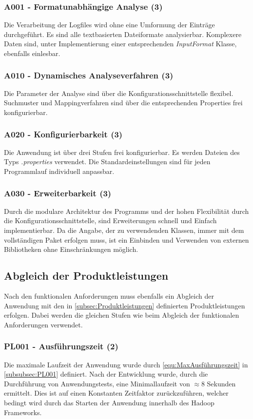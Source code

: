 \subsubsection{A001 - Formatunabhängige Analyse (3)}
Die Verarbeitung der Logfiles wird ohne eine Umformung der Einträge durchgeführt. Es sind alle textbasierten Dateiformate analysierbar. Komplexere Daten sind, unter Implementierung einer entsprechenden \textit{InputFormat} Klasse, ebenfalls einlesbar.

\subsubsection{A010 - Dynamisches Analyseverfahren (3)}
Die Parameter der Analyse sind über die Konfigurationsschnittstelle flexibel. Suchmuster und Mappingverfahren sind über die entsprechenden Properties frei konfigurierbar.

\subsubsection{A020 - Konfigurierbarkeit (3)}
Die Anwendung ist über drei Stufen frei konfigurierbar. Es werden Dateien des Typs \textit{.properties} verwendet. Die Standardeinstellungen sind für jeden Programmlauf individuell anpassbar.

\subsubsection{A030 - Erweiterbarkeit (3)}
Durch die modulare Architektur des Programms und der hohen Flexibilität durch die Konfigurationsschnittstelle, sind Erweiterungen schnell und Einfach implementierbar. Da die Angabe, der zu verwendenden Klassen, immer mit dem vollständigen Paket erfolgen muss, ist ein Einbinden und Verwenden von externen Bibliotheken ohne Einschränkungen möglich.

\subsection{Abgleich der Produktleistungen}
Nach den funktionalen Anforderungen muss ebenfalls ein Abgleich der Anwendung mit den in \autoref{subsec:Produktleistungen} definierten Produktleistungen erfolgen. Dabei werden die gleichen Stufen wie beim Abgleich der funktionalen Anforderungen verwendet.

\subsubsection{PL001 - Ausführungszeit (2)}
Die maximale Laufzeit der Anwendung wurde durch \autoref{equ:MaxAusführungszeit} in \autoref{subsubsec:PL001} definiert. Nach der Entwicklung wurde, durch die Durchführung von Anwendungstests, eine Minimallaufzeit von $\approx 8$ Sekunden ermittelt. Dies ist auf einen Konstanten Zeitfaktor zurückzuführen, welcher bedingt wird durch das Starten der Anwendung innerhalb des Hadoop Frameworks.

